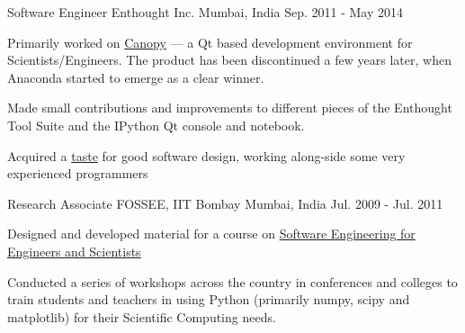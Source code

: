 \begin{cventries}
  \cventry
    {Software Engineer} %
    {Enthought Inc.} %
    {Mumbai, India} %
    {Sep. 2011 - May 2014} %
    {
      \begin{cvitems} %
        \item {Primarily worked on \href{https://web.archive.org/web/20170621202502/https://www.enthought.com/products/canopy/}{Canopy} --- a Qt based development environment for Scientists/Engineers. The product has been discontinued a few years later, when Anaconda started to emerge as a clear winner.}
        \item {Made small contributions and improvements to different pieces of the Enthought Tool Suite and the IPython Qt console and notebook.}
        \item {Acquired a \href{https://rawgit.com/punchagan/340e1350fdfc766c6599/raw/ca1f5fe9bfc1cc503cd8a524e350bd29e8f5f33d/month-with-martin.html}{taste} for good software design, working along-side some very experienced programmers}
      \end{cvitems}
    }

  \cventry
    {Research Associate} %
    {FOSSEE, IIT Bombay} %
    {Mumbai, India} %
    {Jul. 2009 - Jul. 2011} %
    {
      \begin{cvitems} %
        \item {Designed and developed material for a course on \href{https://github.com/FOSSEE/sees}{Software Engineering for Engineers and Scientists}}
        \item {Conducted a series of workshops across the country in conferences and colleges to train students and teachers in using Python (primarily numpy, scipy and matplotlib) for their Scientific Computing needs.}
      \end{cvitems}
    }

\end{cventries}

